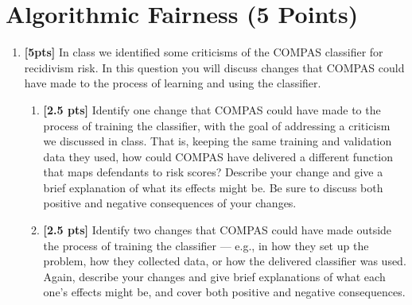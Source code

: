 \section{Algorithmic Fairness (5 Points)}

\begin{enumerate}

\item \textbf{[5pts]} In class we identified some criticisms of the COMPAS classifier for recidivism risk. In this question you will discuss changes that COMPAS could have made to the process of learning and using the classifier. 


\begin{enumerate}
    \item \textbf{[2.5 pts]}  Identify one change that COMPAS could have made to the process of training the classifier, with the goal of addressing a criticism we discussed in class. That is, keeping the same training and validation data they used, how could COMPAS have delivered a different function that maps defendants to risk scores? Describe your change and give a brief explanation of what its effects might be. Be sure to discuss both positive and negative consequences of your changes.

    \begin{tcolorbox}[fit,height=5cm, width=15cm, blank, borderline={1pt}{-2pt}]
\begin{answer}

\end{answer}
    \end{tcolorbox}


    \item \textbf{[2.5 pts]}  Identify two changes that COMPAS could have made outside the process of training the classifier — e.g., in how they set up the problem, how they collected data, or how the delivered classifier was used. Again, describe your changes and give brief explanations of what each one’s effects might be, and cover both positive and negative consequences.

    \begin{tcolorbox}[fit,height=5cm, width=15cm, blank, borderline={1pt}{-2pt}]
\begin{answer}

\end{answer}
    \end{tcolorbox}
\end{enumerate}

\end{enumerate}